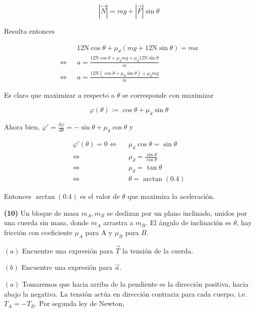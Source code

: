 \documentclass[12pt]{article}
\theoremstyle{definition}
\begin{document}
\begin{equation*}
    \left| \vec{N} \right| = mg + \left| \vec{F} \right| \sin \theta
\end{equation*}

Resulta entonces 

\begin{align*}
    &12\text{N} \cos \theta + \mu_d \left( mg + 12\text{N} \sin \theta \right) =
    ma \\ 
    \iff ~ ~ ~ 
    & a = \frac{ 12\text{N} \cos \theta + \mu_d mg + \mu_d12\text{N}\sin
    \theta}{m}\\ 
    \iff ~ ~ ~ 
    &a = \frac{12\text{N}(\cos \theta + \mu_d \sin \theta) + \mu_d mg}{m}
\end{align*}

Es claro que maximizar $a$ respecto a $\theta$ se corresponde con maximizar

\begin{equation*}
    \varphi(\theta) := \cos \theta + \mu_d  \sin \theta
\end{equation*}

Ahora bien, $\varphi' = \frac{d\varphi}{d\theta} = - \sin \theta + \mu_d \cos
\theta$ y


\begin{align*}
    \varphi'(\theta) = 0 
    \iff ~ ~ ~ 
    &\mu_d \cos \theta = \sin \theta \\ 
    \iff ~ ~ ~ 
    &\mu_d = \frac{\sin \theta}{\cos \theta} \\ 
    \iff ~ ~ ~ 
    &\mu_d = \tan \theta \\ 
    \iff ~ ~ ~
    &\theta = \arctan(0.4) 
\end{align*}

Entonces $\arctan(0.4)$ es el valor de $\theta$ que maximiza la aceleración.

\pagebreak 

\begin{shaded}
    \textbf{(10)} Un bloque de masa $m_A, m_B$ se deslizan por un plano
    inclinado, unidos por una cuerda sin masa, donde $m_A$ arrastra a $m_B$. El
    ángulo de inclinación es $\theta$, hay fricción con coeficiente $\mu_A$ para A
    y $\mu_B$ para $B$. 

    $(a)$ Encuentre una expresión para $\vec{T}$ la tensión de la cuerda. 

    $(b)$ Encuentre una expresión para $\vec{a}$.
\end{shaded}

$(a)$ Tomaremos que hacia arriba de la pendiente es la dirección positiva, hacia
abajo la negativa. La tensión actúa en dirección contraria para cada cuerpo,
i.e. $T_A = -T_B$. Por segunda ley de Newton,
\end{document}
